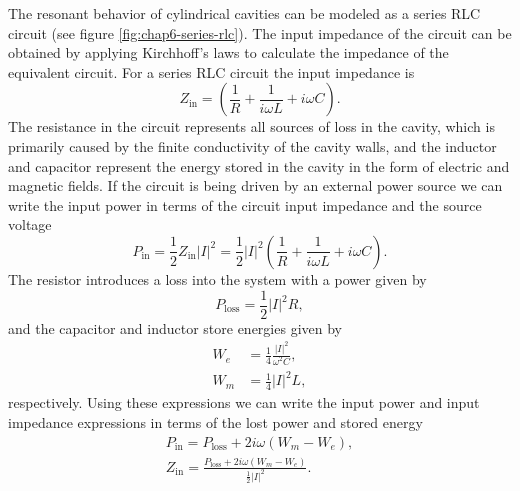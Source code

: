 The resonant behavior of cylindrical cavities can be modeled as a series RLC circuit (see figure \ref{fig:chap6-series-rlc}). The input impedance of the circuit can be obtained by applying Kirchhoff's laws to calculate the impedance of the equivalent circuit. For a series RLC circuit the input impedance is 
\begin{equation}
    Z_\mathrm{in}=\left(\frac{1}{R}+\frac{1}{i\omega L}+i\omega C\right).
\end{equation}
The resistance in the circuit represents all sources of loss in the cavity, which is primarily caused by the finite conductivity of the cavity walls, and the inductor and capacitor represent the energy stored in the cavity in the form of electric and magnetic fields. If the circuit is being driven by an external power source we can write the input power in terms of the circuit input impedance and the source voltage 
\begin{equation}
    P_\mathrm{in} = \frac{1}{2}Z_\mathrm{in}|I|^2=\frac{1}{2}|I|^2\left(\frac{1}{R}+\frac{1}{i\omega L}+i\omega C\right).
\end{equation} 
The resistor introduces a loss into the system with a power given by 
\begin{equation}
    P_\mathrm{loss} = \frac{1}{2}|I|^2R,
\end{equation}
and the capacitor and inductor store energies given by
\begin{align}
    W_e&=\frac{1}{4}\frac{|I|^2}{\omega^2 C},\\
    W_m&=\frac{1}{4}|I|^2 L,
\end{align}
respectively. Using these expressions we can write the input power and input impedance expressions in terms of the lost power and stored energy 
\begin{align}
    P_\mathrm{in}=P_\mathrm{loss}+2i\omega(W_m-W_e),\\
    Z_\mathrm{in}=\frac{P_\mathrm{loss}+2i\omega(W_m-W_e)}{\frac{1}{2}|I|^2}.
\end{align}

